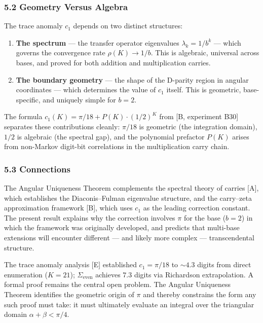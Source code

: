 \documentclass[
  11pt,
]{article}
\begin{document}
\subsubsection{5.2 Geometry Versus Algebra}\label{geometry-versus-algebra}

The trace anomaly \(c_1\) depends on two distinct structures:

\begin{enumerate}
\def\labelenumi{\arabic{enumi}.}
\item
  \textbf{The spectrum} --- the transfer operator eigenvalues
  \(\lambda_k = 1/b^k\) --- which governs the convergence rate
  \(\rho(K) \to 1/b\). This is algebraic, universal across bases, and proved for
  both addition and multiplication carries.
\item
  \textbf{The boundary geometry} --- the shape of the D-parity region in angular
  coordinates --- which determines the value of \(c_1\) itself. This is
  geometric, base-specific, and uniquely simple for \(b = 2\).
\end{enumerate}

The formula \(c_1(K) = \pi/18 + P(K) \cdot (1/2)^K\) from {[}B, experiment
B30{]} separates these contributions cleanly: \(\pi/18\) is geometric (the
integration domain), \(1/2\) is algebraic (the spectral gap), and the polynomial
prefactor \(P(K)\) arises from non-Markov digit-bit correlations in the
multiplication carry chain.

\subsubsection{5.3 Connections}\label{connections}

The Angular Uniqueness Theorem complements the spectral theory of carries
{[}A{]}, which establishes the Diaconis--Fulman eigenvalue structure, and the
carry--zeta approximation framework {[}B{]}, which uses \(c_1\) as the leading
correction constant. The present result explains why the correction involves
\(\pi\) for the base (\(b = 2\)) in which the framework was originally
developed, and predicts that multi-base extensions will encounter different ---
and likely more complex --- transcendental structure.

The trace anomaly analysis {[}E{]} established \(c_1 = \pi/18\) to \({\sim}4.3\)
digits from direct enumeration (\(K = 21\)); \(\Sigma_{\text{even}}\) achieves
\(7.3\) digits via Richardson extrapolation. A formal proof remains the central
open problem. The Angular Uniqueness Theorem identifies the geometric origin of
\(\pi\) and thereby constrains the form any such proof must take: it must
ultimately evaluate an integral over the triangular domain
\(\alpha + \beta < \pi/4\).
\end{document}
